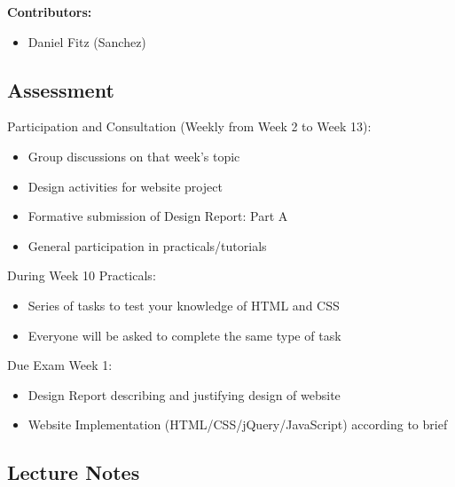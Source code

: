 \documentclass[12pt, a4paper]{report}
\begin{document}
	\tableofcontents
	\vspace{2em}
	\textbf{Contributors:}
	\begin{itemize}
		\item Daniel Fitz (Sanchez)
	\end{itemize}
	\section{Assessment}
	Participation and Consultation (Weekly from Week 2 to Week 13):
	\begin{itemize}
		\item Group discussions on that week's topic
		\item Design activities for website project
		\item Formative submission of Design Report: Part A
		\item General participation in practicals/tutorials
	\end{itemize}
	During Week 10 Practicals:
	\begin{itemize}
		\item Series of tasks to test your knowledge of HTML and CSS
		\item Everyone will be asked to complete the same type of task
	\end{itemize}
	Due Exam Week 1:
	\begin{itemize}
		\item Design Report describing and justifying design of website
		\item Website Implementation (HTML/CSS/jQuery/JavaScript) according to brief
	\end{itemize}

	\newpage

\begin{multicols*}{2}

\chapter{Lecture Notes}







\end{multicols*}
\end{document}
